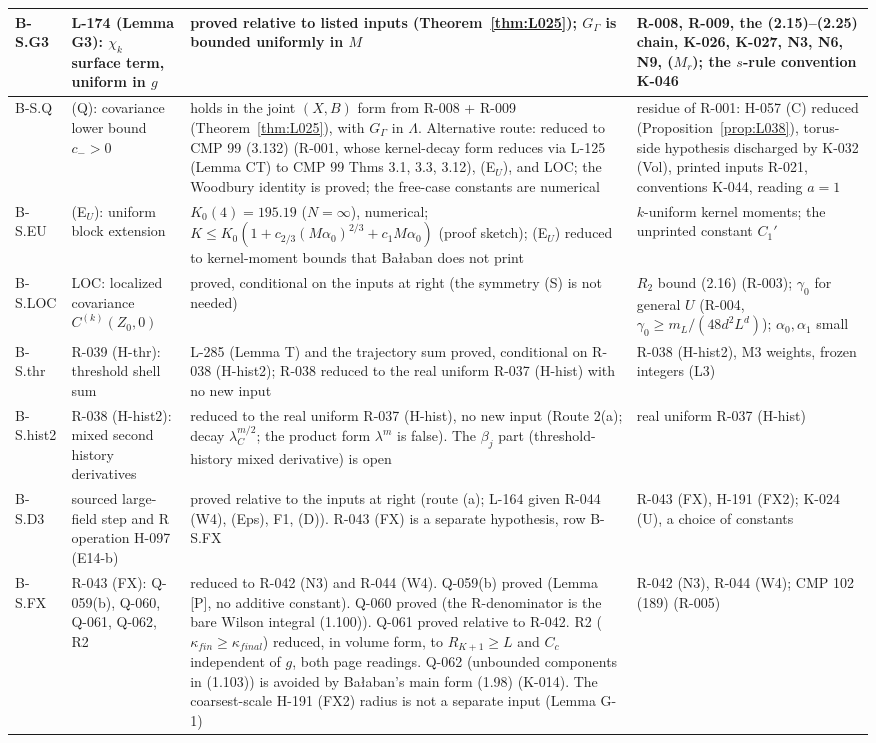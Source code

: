 \begin{longtable}{|p{1.3cm}|p{3.3cm}|p{6.2cm}|p{3.6cm}|}
B-S.G3 & L-174 (Lemma G3): $\chi_k$ surface term, uniform in $g$ & proved relative to listed inputs (Theorem~\ref{thm:L025}); $G_\Gamma$ is bounded uniformly in $M$ & R-008, R-009, the (2.15)--(2.25) chain, K-026, K-027, N3, N6, N9, ($M_r$); the $s$-rule convention K-046 \\ \hline
B-S.Q & (Q): covariance lower bound $c_->0$ & holds in the joint $(X,B)$ form from R-008 + R-009 (Theorem~\ref{thm:L025}), with $G_\Gamma$ in $\Lambda$. Alternative route: reduced to CMP 99 (3.132) (R-001, whose kernel-decay form reduces via L-125 (Lemma CT) to CMP 99 Thms 3.1, 3.3, 3.12), (E$_U$), and LOC; the Woodbury identity is proved; the free-case constants are numerical & residue of R-001: H-057 (C) reduced (Proposition~\ref{prop:L038}), torus-side hypothesis discharged by K-032 (Vol), printed inputs R-021, conventions K-044, reading $a=1$ \\ \hline
B-S.EU & (E$_U$): uniform block extension & $K_0(4)=195.19$ ($N=\infty$), numerical; $K\le K_0(1+c_{2/3}(M\alpha_0)^{2/3}+c_1M\alpha_0)$ (proof sketch); (E$_U$) reduced to kernel-moment bounds that Ba{\l}aban does not print & $k$-uniform kernel moments; the unprinted constant $C_1'$ \\ \hline
B-S.LOC & LOC: localized covariance $C^{(k)}(Z_0,0)$ & proved, conditional on the inputs at right (the symmetry (S) is not needed) & $R_2$ bound (2.16) (R-003); $\gamma_0$ for general $U$ (R-004, $\gamma_0\ge m_L/(48d^2L^d)$); $\alpha_0,\alpha_1$ small \\ \hline
B-S.thr & R-039 (H-thr): threshold shell sum & L-285 (Lemma T) and the trajectory sum proved, conditional on R-038 (H-hist2); R-038 reduced to the real uniform R-037 (H-hist) with no new input & R-038 (H-hist2), M3 weights, frozen integers (L3) \\ \hline
B-S.hist2 & R-038 (H-hist2): mixed second history derivatives & reduced to the real uniform R-037 (H-hist), no new input (Route 2(a); decay $\lambda_C^{m/2}$; the product form $\lambda^m$ is false). The $\beta_j$ part (threshold-history mixed derivative) is open & real uniform R-037 (H-hist) \\ \hline
B-S.D3 & sourced large-field step and R operation H-097 (E14-b) & proved relative to the inputs at right (route (a); L-164 given R-044 (W4), (Eps), F1, (D)). R-043 (FX) is a separate hypothesis, row B-S.FX & R-043 (FX), H-191 (FX2); K-024 (U), a choice of constants \\ \hline
B-S.FX & R-043 (FX): Q-059(b), Q-060, Q-061, Q-062, R2 & reduced to R-042 (N3) and R-044 (W4). Q-059(b) proved (Lemma [P], no additive constant). Q-060 proved (the R-denominator is the bare Wilson integral (1.100)). Q-061 proved relative to R-042. R2 ($\kappa_{fin}\ge\kappa_{final}$) reduced, in volume form, to $R_{K+1}\ge L$ and $C_c$ independent of $g$, both page readings. Q-062 (unbounded components in (1.103)) is avoided by Ba{\l}aban's main form (1.98) (K-014). The coarsest-scale H-191 (FX2) radius is not a separate input (Lemma G-1) & R-042 (N3), R-044 (W4); CMP 102 (189) (R-005) \\ \hline

\end{longtable}
